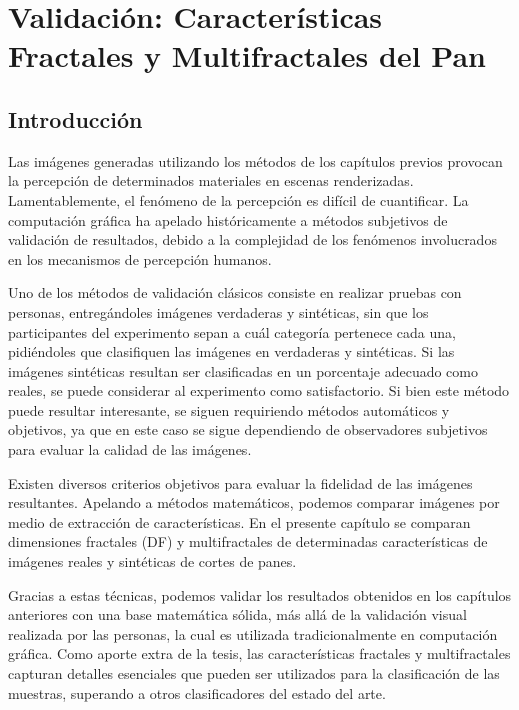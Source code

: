 \chapter[Características Fractales del Pan]{Validación: Características Fractales y Multifractales del Pan}

\section{Introducción}


Las imágenes generadas utilizando los métodos de los capítulos previos provocan la percepción de determinados materiales en escenas renderizadas.
Lamentablemente, el fenómeno de la percepción es difícil de cuantificar.
La computación gráfica ha apelado históricamente a métodos subjetivos de validación de resultados, debido a la complejidad de los fenómenos involucrados en los mecanismos de percepción humanos.

Uno de los métodos de validación clásicos consiste en realizar pruebas con personas, entreg\'andoles im\'agenes verdaderas y sint\'eticas, sin que los participantes del experimento sepan a cu\'al categor\'ia pertenece cada una, pidi\'endoles que clasifiquen las im\'agenes en verdaderas y sint\'eticas.
Si las im\'agenes sint\'eticas resultan ser clasificadas en un porcentaje adecuado como reales, se puede considerar al experimento como satisfactorio.
Si bien este método puede resultar interesante, se siguen requiriendo métodos automáticos y objetivos, ya que en este caso se sigue dependiendo de observadores subjetivos para evaluar la calidad de las imágenes.




Existen diversos criterios objetivos para evaluar la fidelidad de las im\'agenes resultantes.
Apelando a métodos matemáticos, podemos comparar imágenes por medio de extracci\'on de caracter\'isticas.
En el presente capítulo se comparan dimensiones fractales (\acrshort{DF}) y multifractales de determinadas caracter\'isticas de imágenes reales y sint\'eticas de cortes de panes.


Gracias a estas t\'ecnicas, podemos validar los resultados obtenidos en los cap\'itulos anteriores con una base matem\'atica s\'olida, m\'as all\'a de la validaci\'on visual realizada por las personas, la cual es utilizada tradicionalmente en computaci\'on gr\'afica.
Como aporte extra de la tesis, las características fractales y multifractales capturan detalles esenciales que pueden ser utilizados para la clasificación de las muestras, superando a otros clasificadores del estado del arte.


